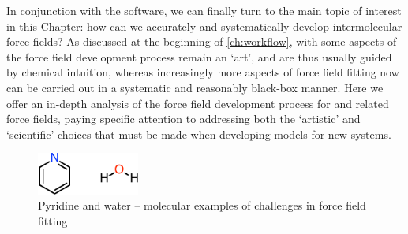 In conjunction with the \pointer software, we can finally turn to the
main topic of interest in this Chapter: how can we accurately and
systematically develop intermolecular force fields? As discussed at the
beginning of \cref{ch:workflow},
with \mastiff
some aspects of the force field development process remain an `art', and are thus
usually guided by chemical intuition, whereas increasingly more aspects of force field
fitting now can be carried out in a systematic and reasonably black-box manner. Here
we offer an in-depth analysis of the force field development process for
\mastiff and related force fields, paying
specific attention to addressing both the `artistic' and `scientific' choices
that must be made when developing models for new systems. 

\begin{figure}
\centering
\includegraphics[width=0.3\textwidth]{pointer/molecules.pdf}
\caption{Pyridine and water -- molecular examples of challenges in force field fitting}
\label{fig:pointer-molecules}
\end{figure}


